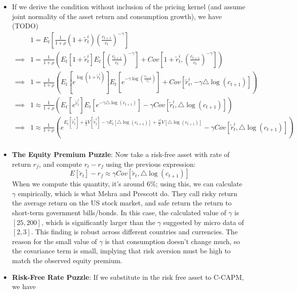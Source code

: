 \documentclass[12pt]{article}
\begin{document}
\begin{itemize}
    \item If we derive the condition without inclusion of the pricing kernel (and assume joint normality of the asset return and consumption growth), we have (TODO)
    \[\begin{split}
        &1 = E_t\left[\frac{1}{1+\rho} (1+\widetilde{r}_t^i)\left(\frac{c_{t+1}}{c_t}\right)^{-\gamma}\right] \\
        \implies &1 = \frac{1}{1+\rho}\left(E_t\left[ 1+\widetilde{r}_t^i\right]E_t\left[\left(\frac{c_{t+1}}{c_t}\right)^{-\gamma}\right] + Cov\left[1+\widetilde{r}_t^i, \left(\frac{c_{t+1}}{c_t}\right)^{-\gamma}\right]\right) \\
        \implies &1 = \frac{1}{1+\rho}\left(E_t\left[ e^{\log(1+\widetilde{r}_t^i)}\right]E_t\left[e^{-\gamma\log\left(\frac{c_{t+1}}{c_t}\right)}\right] + Cov\left[\widetilde{r}_t^i, -\gamma \triangle\log(c_{t+1})\right]\right) \\
        \implies &1 \approx \frac{1}{1+\rho}\left(E_t\left[e^{\widetilde{r}_t^i}\right]E_t\left[e^{-\gamma \triangle\log (c_{t+1})}\right] -\gamma Cov\left[\widetilde{r}_t^i,  \triangle\log(c_{t+1})\right]\right) \\
        \implies &1 \approx \frac{1}{1+\rho}\left(e^{E_t[\widetilde{r}_t^i] + \frac{1}{2}V[\widetilde{r}_t^i]-\gamma E_t[\triangle\log (c_{t+1})] + \frac{\gamma^2}{2}V[\triangle\log (c_{t+1})]} -\gamma Cov\left[\widetilde{r}_t^i,  \triangle\log(c_{t+1})\right]\right) \\
    \end{split}\]
    \item \textbf{The Equity Premium Puzzle}: Now take a risk-free asset with rate of return $r_f$, and compute $r_t - r_f$ using the previous expression:
    \[E[\widetilde{r}_t] - r_f \approx \gamma Cov[\widetilde{r}_t, \triangle \log(c_{t+1})]\]
    When we compute this quantity, it's around 6\%; using this, we can calculate $\gamma$ empirically, which is what Mehra and Prescott do. They call risky return the average return on the US stock market, and safe return the return to short-term government bills/bonds. In this case, the calculated value of $\gamma$ is $[25,200]$, which is significantly larger than the $\gamma$ suggested by micro data of $[2,3]$. This finding is robust across different countries and currencies. The reason for the small value of $\gamma$ is that consumption doesn't change much, so the covariance term is small, implying that risk aversion must be high to match the observed equity premium.
    \item \textbf{Risk-Free Rate Puzzle}: If we substitute in the risk free asset to C-CAPM, we have

\end{itemize}
\end{document}

